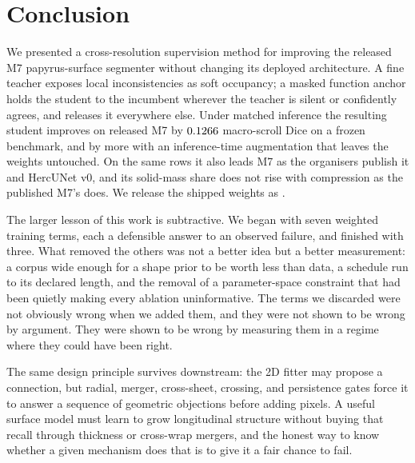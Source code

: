 \section{Conclusion}
\label{sec:conclusion}

We presented a cross-resolution supervision method for improving the released
M7 papyrus-surface segmenter without changing its deployed architecture.
A fine teacher exposes local inconsistencies as soft occupancy; a masked
function anchor holds the student to the incumbent wherever the teacher is
silent or confidently agrees, and releases it everywhere else.
Under matched inference the resulting student improves on released M7 by
$0.1266$ macro-scroll Dice on a frozen benchmark, and by more with an
inference-time augmentation that leaves the weights untouched.
On the same rows it also leads M7 as the organisers publish it and HercUNet v0,
and its solid-mass share does not rise with compression as the published M7's
does.
We release the shipped weights as \releaseName.

The larger lesson of this work is subtractive.
We began with seven weighted training terms, each a defensible answer to an
observed failure, and finished with three.
What removed the others was not a better idea but a better measurement: a
corpus wide enough for a shape prior to be worth less than data, a schedule run
to its declared length, and the removal of a parameter-space constraint that
had been quietly making every ablation uninformative.
The terms we discarded were not obviously wrong when we added them, and they
were not shown to be wrong by argument.
They were shown to be wrong by measuring them in a regime where they could have
been right.

The same design principle survives downstream: the 2D fitter may propose a
connection, but radial, merger, cross-sheet, crossing, and persistence gates
force it to answer a sequence of geometric objections before adding pixels.
A useful surface model must learn to grow longitudinal structure without buying
that recall through thickness or cross-wrap mergers, and the honest way to know
whether a given mechanism does that is to give it a fair chance to fail.

